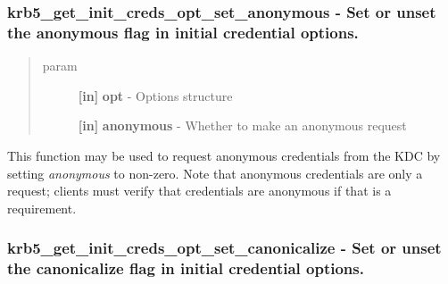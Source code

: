 \documentclass[letterpaper,10pt,english]{sphinxmanual}
\begin{document}
\subsubsection{krb5\_get\_init\_creds\_opt\_set\_anonymous -  Set or unset the anonymous flag in initial credential options.}
\label{appdev/refs/api/krb5_get_init_creds_opt_set_anonymous:krb5-get-init-creds-opt-set-anonymous-set-or-unset-the-anonymous-flag-in-initial-credential-options}\label{appdev/refs/api/krb5_get_init_creds_opt_set_anonymous::doc}

\begin{fulllineitems}
\label{appdev/refs/api/krb5_get_init_creds_opt_set_anonymous:krb5_get_init_creds_opt_set_anonymous}
\end{fulllineitems}

\begin{quote}\begin{description}
\item[{param}] \leavevmode
\textbf{{[}in{]}} \textbf{opt} - Options structure

\textbf{{[}in{]}} \textbf{anonymous} - Whether to make an anonymous request

\end{description}\end{quote}

This function may be used to request anonymous credentials from the KDC by setting \emph{anonymous} to non-zero. Note that anonymous credentials are only a request; clients must verify that credentials are anonymous if that is a requirement.


\subsubsection{krb5\_get\_init\_creds\_opt\_set\_canonicalize -  Set or unset the canonicalize flag in initial credential options.}
\label{appdev/refs/api/krb5_get_init_creds_opt_set_canonicalize:krb5-get-init-creds-opt-set-canonicalize-set-or-unset-the-canonicalize-flag-in-initial-credential-options}\label{appdev/refs/api/krb5_get_init_creds_opt_set_canonicalize::doc}

\begin{fulllineitems}
\label{appdev/refs/api/krb5_get_init_creds_opt_set_canonicalize:krb5_get_init_creds_opt_set_canonicalize}
\end{fulllineitems}
\end{document}
